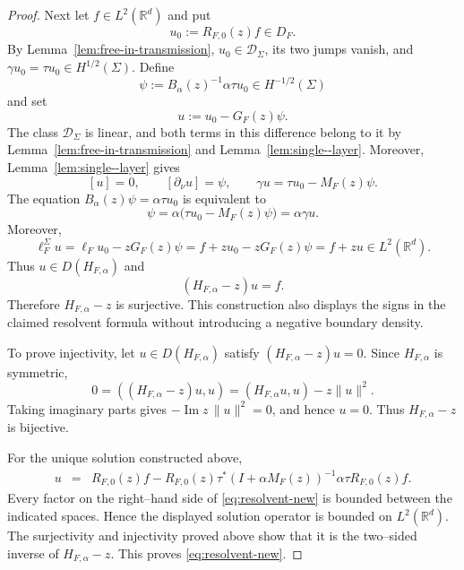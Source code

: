 \documentclass[10pt,a4paper]{amsart}
\begin{document}
\begin{proof}
Next let $f\in L^2(\mathbb R^d)$ and put
$$
u_0:=R_{F,0}(z)f\in D_F.
$$
By Lemma~\ref{lem:free-in-transmission}, $u_0\in\mathcal D_\Sigma$, its two jumps vanish, and $\gamma u_0=\tau u_0\in H^{1/2}(\Sigma)$.
Define
$$
\psi:=B_\alpha(z)^{-1}\alpha\tau u_0
\in H^{-1/2}(\Sigma)
$$
and set
$$
u:=u_0-G_F(z)\psi.
$$
The class $\mathcal D_\Sigma$ is linear, and both terms in this difference belong to it by Lemma~\ref{lem:free-in-transmission} and Lemma~\ref{lem:single--layer}.
Moreover, Lemma~\ref{lem:single--layer} gives
$$
[u]=0,
\qquad
[\partial_\nu u]=\psi,
\qquad
\gamma u=\tau u_0-M_F(z)\psi.
$$
The equation $B_\alpha(z)\psi=\alpha\tau u_0$ is equivalent to
$$
\psi
=\alpha\bigl(\tau u_0-M_F(z)\psi\bigr)
=\alpha\gamma u.
$$
Moreover,
$$
\ell_F^\Sigma u
=
\ell_Fu_0-zG_F(z)\psi
=
f+zu_0-zG_F(z)\psi
=
f+zu
\in L^2(\mathbb R^d).
$$
Thus $u\in D(H_{F,\alpha})$ and
$$
(H_{F,\alpha}-z)u=f.
$$
Therefore $H_{F,\alpha}-z$ is surjective.
This construction also displays the signs in the claimed resolvent formula without introducing a negative boundary density.

To prove injectivity, let $u\in D(H_{F,\alpha})$ satisfy $(H_{F,\alpha}-z)u=0$.
Since $H_{F,\alpha}$ is symmetric,
$$
0=((H_{F,\alpha}-z)u,u)
=(H_{F,\alpha}u,u)-z\|u\|^2.
$$
Taking imaginary parts gives $-\operatorname{Im}z\,\|u\|^2=0$, and hence $u=0$.
Thus $H_{F,\alpha}-z$ is bijective.

For the unique solution constructed above,
\begin{eqnarray*}
u
&=&R_{F,0}(z)f
-R_{F,0}(z)\tau^*(I+\alpha M_F(z))^{-1}
\alpha\tau R_{F,0}(z)f.
\end{eqnarray*}
Every factor on the right--hand side of \eqref{eq:resolvent-new} is bounded between the indicated spaces.
Hence the displayed solution operator is bounded on $L^2(\mathbb R^d)$.
The surjectivity and injectivity proved above show that it is the two--sided inverse of $H_{F,\alpha}-z$.
This proves \eqref{eq:resolvent-new}.
\end{proof}
\end{document}
